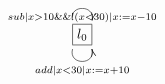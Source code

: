 $\xymatrix{
   \fbox{$l_0$} \ar@(ul,ur)[]_{sub | x > 10 \&\& !(x < 30) | x := x - 10} \ar@(dl,dr)[]_{add | x < 30 | x := x + 10}
}$
